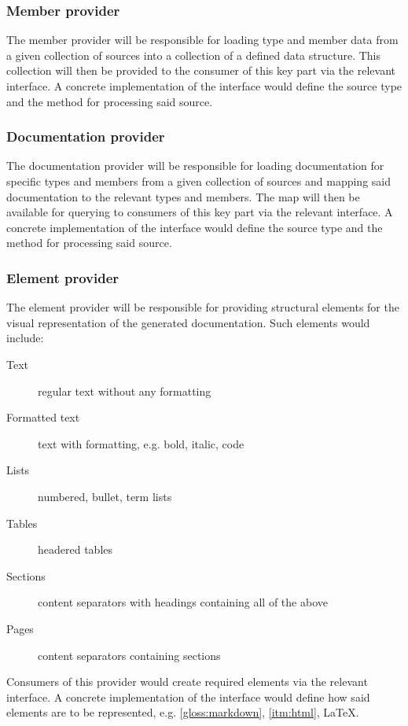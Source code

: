 \subsubsection{Member provider}

The member provider will be responsible for loading type and member data from a given collection of sources into a collection of a defined data structure.
This collection will then be provided to the consumer of this key part via the relevant interface.
A concrete implementation of the interface would define the source type and the method for processing said source.

\subsubsection{Documentation provider}

The documentation provider will be responsible for loading documentation for specific types and members from a given collection of sources and mapping said documentation to the relevant types and members.
The map will then be available for querying to consumers of this key part via the relevant interface.
A concrete implementation of the interface would define the source type and the method for processing said source.

\subsubsection{Element provider} \label{sec:elementProvider}

The element provider will be responsible for providing structural elements for the visual representation of the generated documentation. Such elements would include:
\begin{description}
    \item[Text] regular text without any formatting
    \item[Formatted text] text with formatting, e.g. bold, italic, code
    \item[Lists] numbered, bullet, term lists
    \item[Tables] headered tables
    \item[Sections] content separators with headings containing all of the above
    \item[Pages] content separators containing sections
\end{description}

Consumers of this provider would create required elements via the relevant interface.
A concrete implementation of the interface would define how said elements are to be represented, e.g. \ref{gloss:markdown}, \ref{itm:html}, \LaTeX.

